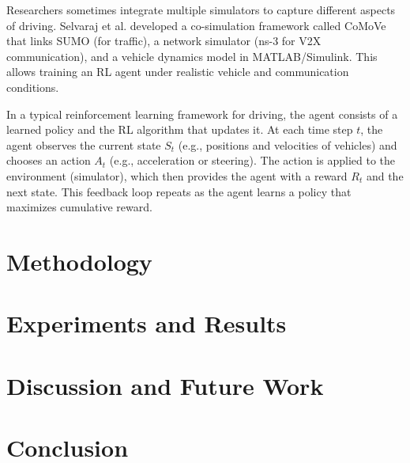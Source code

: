 \documentclass[12pt,a4paper]{article}
\begin{document}
Researchers sometimes integrate multiple simulators to capture different aspects of driving. Selvaraj et al.\cite{selvaraj2023} developed a co-simulation framework called CoMoVe that links SUMO (for traffic), a network simulator (ns-3 for V2X communication), and a vehicle dynamics model in MATLAB/Simulink. This allows training an RL agent under realistic vehicle and communication conditions.

In a typical reinforcement learning framework for driving, the agent consists of a learned policy and the RL algorithm that updates it. At each time step $t$, the agent observes the current state $S_t$ (e.g., positions and velocities of vehicles) and chooses an action $A_t$ (e.g., acceleration or steering). The action is applied to the environment (simulator), which then provides the agent with a reward $R_t$ and the next state. This feedback loop repeats as the agent learns a policy that maximizes cumulative reward.

\section{Methodology}

\section{Experiments and Results}

\section{Discussion and Future Work}


\section{Conclusion}




\end{document}
